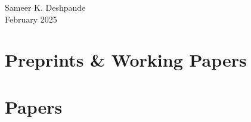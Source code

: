 \documentclass[10pt]{article}
\begin{document}
\begin{center}
{ \Large Sameer K. Deshpande } \\
February 2025
\end{center}


\section*{Preprints \& Working Papers}
\nocite{*}
\printbibliography[heading=none]

\section*{Papers}
\nocite{*}
\printbibliography[heading=none]
\end{document}
